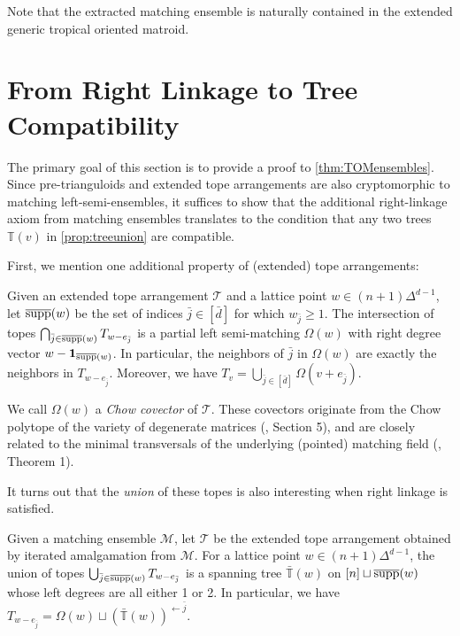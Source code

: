 \documentclass[letterpaper,reqno,11pt]{amsart}
\begin{document}
Note that the extracted matching ensemble is naturally contained in the extended generic tropical oriented matroid.

\section{From Right Linkage to Tree Compatibility}\label{sec:equivaxiom}

The primary goal of this section is to provide a proof to \cref{thm:TOMensembles}. Since pre-trianguloids and extended tope arrangements are also cryptomorphic to matching left-semi-ensembles, it suffices to show that the additional right-linkage axiom from matching ensembles translates to the condition that any two trees $\mathbb{T}(v)$ in \cref{prop:treeunion} are compatible. 

First, we mention one additional property of (extended) tope arrangements:

\begin{proposition}
    Given an extended tope arrangement $\mathcal{T}$ and a lattice point $w\in (n+1)\Delta^{d-1}$, let $\overline{\textnormal{supp}}(w)$ be the set of indices $\bar{j}\in [\bar{d}]$ for which $w_{\bar{j}}\geq 1$. The intersection of topes $\bigcap_{\bar{j}\in \overline{\textnormal{supp}}(w)} T_{w-e_{\bar{j}}}$ is a partial left semi-matching $\Omega(w)$ with right degree vector $w - \mathbf{1}_{\overline{\textnormal{supp}}(w)}$. In particular, the neighbors of $\bar{j}$ in $\Omega(w)$ are exactly the neighbors in $T_{w-e_{\bar{j}}}$.
    Moreover, we have $T_v = \bigcup_{\bar{j}\in [\bar{d}]} \Omega(v + e_{\bar{j}})$.
\end{proposition}

We call $\Omega(w)$ a \emph{Chow covector} of $\mathcal{T}$. These covectors originate from the Chow polytope of the variety of degenerate matrices (\cite{MaxMinors}, Section 5), and are closely related to the minimal transversals of the underlying (pointed) matching field (\cite{Fields}, Theorem 1).

It turns out that the \emph{union} of these topes is also interesting when right linkage is satisfied.

\begin{proposition}\label{prop:othertreeunion}
    Given a matching ensemble $\mathcal{M}$, let $\mathcal{T}$ be the extended tope arrangement obtained by iterated amalgamation from $\mathcal{M}$. For a lattice point $w\in (n+1)\Delta^{d-1}$, the union of topes $\bigcup_{\bar{j}\in \overline{\textnormal{supp}}(w)} T_{w-e_{\bar{j}}}$ is a spanning tree $\bar{\mathbb{T}}(w)$ on $[n]\sqcup \overline{\textnormal{supp}}(w)$ whose left degrees are all either 1 or 2. In particular, we have $T_{w-e_{\bar{j}}} = \Omega(w) \sqcup (\bar{\mathbb{T}}(w))^{\leftarrow \bar{j}}$.
\end{proposition}
\end{document}
